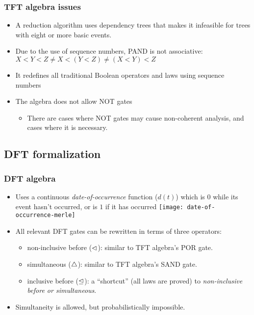 \begin{frame}
\frametitle{TFT algebra issues}

\begin{itemize}
  \item A reduction algorithm uses dependency trees that makes it infeasible for trees with eight or more basic events.
  \item Due to the use of sequence numbers, PAND is not associative: $X<Y<Z \ne X<(Y<Z) \ne (X<Y)<Z$ 
  \item It redefines all traditional Boolean operators and laws using sequence numbers 
  \item The algebra does not allow NOT gates
    \begin{itemize}
      \item<2-> There are cases where NOT gates may cause non-coherent analysis, and cases where it is necessary.
    \end{itemize}
\end{itemize}
\end{frame}

\subsection{DFT formalization}

\begin{frame}
\frametitle{DFT algebra}

\begin{itemize}
  \item Uses a continuous \emph{date-of-occurrence} function ($d(t)$) which is $0$ while its event hasn't occurred, or is $1$ if it has occurred
  \texttt{[image: date-of-occurrence-merle]}
  \item All relevant DFT gates can be rewritten in terms of three operators: 
    \begin{itemize}
      \item non-inclusive before ($\operatorname{\lhd}$): similar to TFT algebra's POR gate.
      \item simultaneous ($\operatorname{\triangle}$): similar to TFT algebra's SAND gate.
      \item inclusive before ($\operatorname{\unlhd}$): a ``shortcut'' (all laws are proved) to \emph{non-inclusive before or simultaneous}.
    \end{itemize}  
  \item Simultaneity is allowed, but probabilistically impossible.
\end{itemize}
\end{frame}


